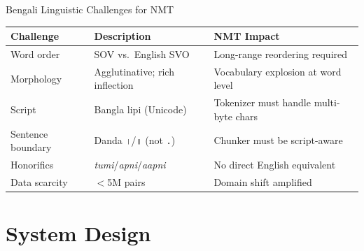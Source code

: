 \documentclass[aspectratio=169,10pt]{beamer}
\begin{document}
\begin{frame}{Bengali Linguistic Challenges for NMT}
  \begin{table}
  \small
  \begin{tabular}{lll}
    \toprule
    Challenge & Description & NMT Impact \\
    \midrule
    Word order & SOV vs.\ English SVO & Long-range reordering required \\
    Morphology & Agglutinative; rich inflection & Vocabulary explosion at word level \\
    Script & Bangla lipi (Unicode) & Tokenizer must handle multi-byte chars \\
    Sentence boundary & Danda \texttt{।}/\texttt{॥} (not \texttt{.}) & Chunker must be script-aware \\
    Honorifics & \textit{tumi}/\textit{apni}/\textit{aapni} & No direct English equivalent \\
    Data scarcity & $<$5M pairs & Domain shift amplified \\
    \bottomrule
  \end{tabular}
  \end{table}
\end{frame}

\section{System Design}
\end{document}
